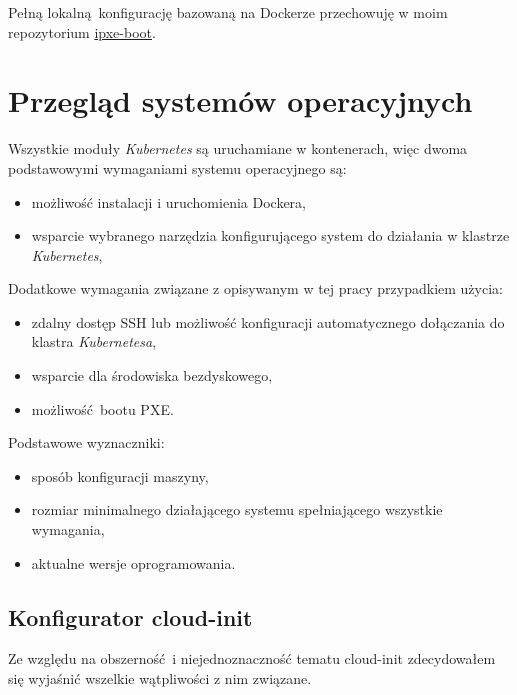 \documentclass[a4paper,12pt,twoside,openany]{report}
\providecommand{\tightlist}{%
  \setlength{\itemsep}{0pt}\setlength{\parskip}{0pt}}
\begin{document}
Pełną lokalną~konfigurację bazowaną na Dockerze przechowuję w moim
repozytorium \href{https://github.com/nazarewk/ipxe-boot}{ipxe-boot}.

\hypertarget{przeglux105d-systemuxf3w-operacyjnych}{%
\chapter{Przegląd systemów
operacyjnych}\label{przeglux105d-systemuxf3w-operacyjnych}}

Wszystkie moduły \emph{Kubernetes} są uruchamiane w kontenerach, więc
dwoma podstawowymi wymaganiami systemu operacyjnego są:

\begin{itemize}
\tightlist
\item
  możliwość instalacji i uruchomienia Dockera,
\item
  wsparcie wybranego narzędzia konfigurującego system do działania w
  klastrze \emph{Kubernetes},
\end{itemize}

Dodatkowe wymagania związane z opisywanym w tej pracy przypadkiem
użycia:

\begin{itemize}
\tightlist
\item
  zdalny dostęp SSH lub możliwość konfiguracji automatycznego dołączania
  do klastra \emph{Kubernetesa},
\item
  wsparcie dla środowiska bezdyskowego,
\item
  możliwość~bootu PXE.
\end{itemize}

Podstawowe wyznaczniki:

\begin{itemize}
\tightlist
\item
  sposób konfiguracji maszyny,
\item
  rozmiar minimalnego działającego systemu spełniającego wszystkie
  wymagania,
\item
  aktualne wersje oprogramowania.
\end{itemize}

\hypertarget{cloud-init-config}{%
\section{Konfigurator cloud-init}\label{cloud-init-config}}

Ze względu na obszerność~i niejednoznaczność tematu cloud-init
zdecydowałem się wyjaśnić wszelkie wątpliwości z nim związane.
\end{document}
